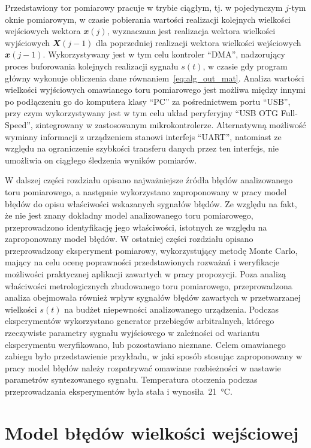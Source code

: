 Przedstawiony tor pomiarowy pracuje w trybie ciągłym, tj. w pojedynczym $j$-tym oknie pomiarowym, w czasie pobierania wartości realizacji kolejnych wielkości wejściowych wektora $\mathbfit{x}(j)$, wyznaczana jest realizacja wektora wielkości wyjściowych $\mathbfit{X}(j-1)$ dla poprzedniej realizacji wektora wielkości wejściowych $\mathbfit{x}(j-1)$. Wykorzystywany jest w tym celu kontroler \enquote{DMA}, nadzorujący proces buforowania kolejnych realizacji sygnału $s(t)$, w czasie gdy program główny wykonuje obliczenia dane równaniem~\eqref{eq:alg_out_mat}. Analiza wartości wielkości wyjściowych omawianego toru pomiarowego jest możliwa między innymi po podłączeniu go do komputera klasy \enquote{PC} za pośrednictwem portu \enquote{USB}, przy czym wykorzystywany jest w tym celu układ peryferyjny \enquote{USB OTG Full-Speed}, zintegrowany w zastosowanym mikrokontrolerze. Alternatywną możliwość wymiany informacji z urządzeniem stanowi interfejs \enquote{UART}, natomiast ze względu na ograniczenie szybkości transferu danych przez ten interfejs, nie umożliwia on ciągłego śledzenia wyników pomiarów.

W dalszej części rozdziału opisano najważniejsze źródła błędów analizowanego toru pomiarowego, a następnie wykorzystano zaproponowany w pracy model błędów do opisu właściwości wskazanych sygnałów błędów. Ze względu na fakt, że nie jest znany dokładny model analizowanego toru pomiarowego, przeprowadzono identyfikację jego właściwości, istotnych ze względu na zaproponowany model błędów. W ostatniej części rozdziału opisano przeprowadzony eksperyment pomiarowy, wykorzystujący metodę Monte Carlo, mający na celu ocenę poprawności przedstawionych rozważań i weryfikacje możliwości praktycznej aplikacji zawartych w pracy propozycji. Poza analizą właściwości metrologicznych zbudowanego toru pomiarowego, przeprowadzona analiza obejmowała również wpływ sygnałów błędów zawartych w przetwarzanej wielkości $s(t)$ na budżet niepewności analizowanego urządzenia. Podczas eksperymentów wykorzystano generator przebiegów arbitralnych, którego rzeczywiste parametry sygnału wyjściowego w zależności od wariantu eksperymentu weryfikowano, lub pozostawiano nieznane. Celem omawianego zabiegu było przedstawienie przykładu, w jaki sposób stosując zaproponowany w pracy model błędów należy rozpatrywać omawiane rozbieżności w nastawie parametrów syntezowanego sygnału. Temperatura otoczenia podczas przeprowadzania eksperymentów była stała i wynosiła~\qty{21}{\degreeCelsius}.

\section{Model błędów wielkości wejściowej}

